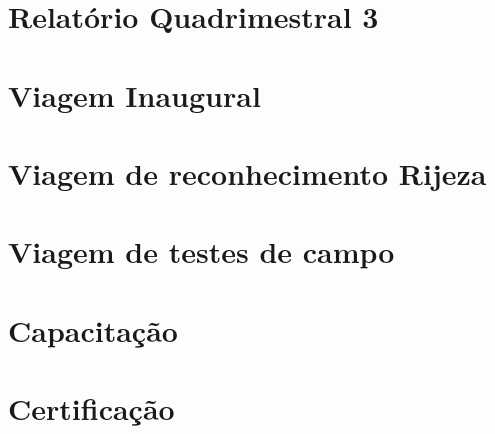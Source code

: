 \documentclass[a4paper,11pt,oneside,brazilian,
draft=false,twocolumn]{report}%
\newcommand*{\standardchapterstyle}{%
  \titleformat{\chapter}[display]
  {\normalfont\huge\bfseries}{\chaptertitlename\ \thechapter}{20pt}{\Huge}
  \titlespacing*{\chapter}{0pt}{50pt}{40pt}
}
\begin{document}
\chapter{Relatório Quadrimestral 3}


\chapter{Viagem Inaugural}



\chapter{Viagem de reconhecimento Rijeza}



\chapter{Viagem de testes de campo}




\chapter{Capacitação}


\chapter{Certificação}







 
 
%
%
%
%
%
%





%

\standardchapterstyle   
\end{document}
